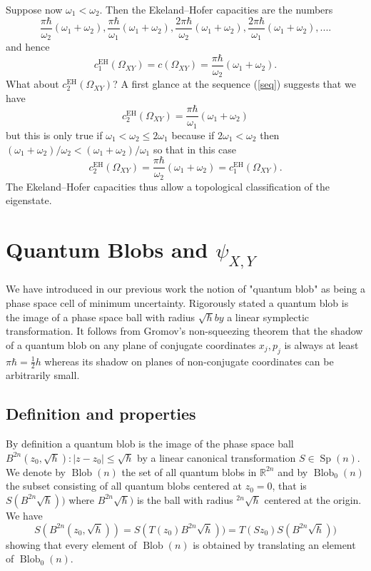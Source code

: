 \documentclass[11pt]{article}%
\begin{document}
Suppose now $\omega_{1}<\omega_{2}$. Then the Ekeland--Hofer capacities are
the numbers%
\begin{equation}
\frac{\pi\hbar}{\omega_{2}}(\omega_{1}+\omega_{2}),\frac{\pi\hbar}{\omega_{1}%
}(\omega_{1}+\omega_{2}),\frac{2\pi\hbar}{\omega_{2}}(\omega_{1}+\omega
_{2}),\frac{2\pi\hbar}{\omega_{1}}(\omega_{1}+\omega_{2}),.... \label{seq}%
\end{equation}
and hence
\[
c_{1}^{\mathrm{EH}}(\Omega_{XY})=c(\Omega_{XY})=\frac{\pi\hbar}{\omega_{2}%
}(\omega_{1}+\omega_{2}).
\]
What about $c_{2}^{\mathrm{EH}}(\Omega_{XY})$? A first glance at the sequence
(\ref{seq}) suggests that we have
\[
c_{2}^{\mathrm{EH}}(\Omega_{XY})=\frac{\pi\hbar}{\omega_{1}}(\omega_{1}%
+\omega_{2})
\]
but this is only true if $\omega_{1}<\omega_{2}\leq2\omega_{1}$ because if
$2\omega_{1}<\omega_{2}$ then $(\omega_{1}+\omega_{2})/\omega_{2}<(\omega
_{1}+\omega_{2})/\omega_{1}$ so that in this case
\[
c_{2}^{\mathrm{EH}}(\Omega_{XY})=\frac{\pi\hbar}{\omega_{2}}(\omega_{1}%
+\omega_{2})=c_{1}^{\mathrm{EH}}(\Omega_{XY}).
\]
The Ekeland--Hofer capacities thus allow a topological classification of the eigenstate.

\section{Quantum Blobs and $\psi_{X,Y}$}

We have introduced in our previous work \cite{blob,goluPR} the notion of
"quantum blob" as being a phase space cell of minimum uncertainty. Rigorously
stated a quantum blob is the image of a phase space ball with radius
$\sqrt{\hbar}by$ a linear symplectic transformation. It follows from Gromov's
non-squeezing theorem \cite{gr85} that the shadow of a quantum blob on any
plane of conjugate coordinates $x_{j},p_{j}$ is always at least $\pi
\hbar=\frac{1}{2}h$ whereas its shadow on planes of non-conjugate coordinates
can be arbitrarily small.

\subsection{Definition and properties}

By definition a quantum blob is the image of the phase space ball
$B^{2n}(z_{0},\sqrt{\hbar}):|z-z_{0}|\leq\sqrt{\hbar}$ by a linear canonical
transformation $S\in\operatorname*{Sp}(n)$. We denote by $\operatorname*{Blob}%
(n)$ the set of all quantum blobs in $\mathbb{R}^{2n}$ and by
$\operatorname*{Blob}_{0}(n)$ the subset consisting of all quantum blobs
centered at $z_{0}=0$, that is $S(B^{2n}\sqrt{\hbar}))$ where $B^{2n}%
\sqrt{\hbar})$ is the ball with radius $^{2n}\sqrt{\hbar}$ centered at the
origin. We have
\[
S(B^{2n}(z_{0},\sqrt{\hbar}))=S(T(z_{0})B^{2n}\sqrt{\hbar}))=T(Sz_{0}%
)S(B^{2n}\sqrt{\hbar}))
\]
showing that every element of $\operatorname*{Blob}(n)$ is obtained by
translating an element of $\operatorname*{Blob}_{0}(n).$
\end{document}
